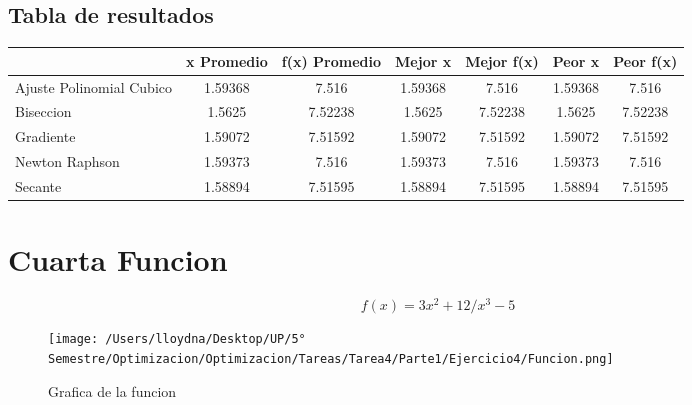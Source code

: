 \documentclass{report}
\begin{document}
            \subsection{Tabla de resultados}
            \begin{tabular}{l|c|c|c|c|c|c}
                & x Promedio & f(x) Promedio & Mejor x & Mejor f(x) & Peor x & Peor f(x)\\
                \hline
                Ajuste Polinomial Cubico & 1.59368 & 7.516 & 1.59368 & 7.516 & 1.59368 & 7.516\\
                \hline
                Biseccion & 1.5625 & 7.52238 & 1.5625 & 7.52238 & 1.5625 & 7.52238\\
                \hline
                Gradiente & 1.59072 & 7.51592 & 1.59072 & 7.51592 & 1.59072 & 7.51592\\
                \hline
                Newton Raphson & 1.59373 & 7.516 & 1.59373 & 7.516 & 1.59373 & 7.516\\
                \hline
                Secante & 1.58894 & 7.51595 & 1.58894 & 7.51595 & 1.58894 & 7.51595\\
                \hline
            \end{tabular}
        \pagebreak

        \section{Cuarta Funcion}
            \begin{equation*}
                f(x)=3x^2+12/x^3-5
            \end{equation*}

            \begin{figure}[H]
                \texttt{[image: /Users/lloydna/Desktop/UP/5° Semestre/Optimizacion/Optimizacion/Tareas/Tarea4/Parte1/Ejercicio4/Funcion.png]}
                \caption{Grafica de la funcion}
                \label{fig:fun14}
            \end{figure}
\end{document}
